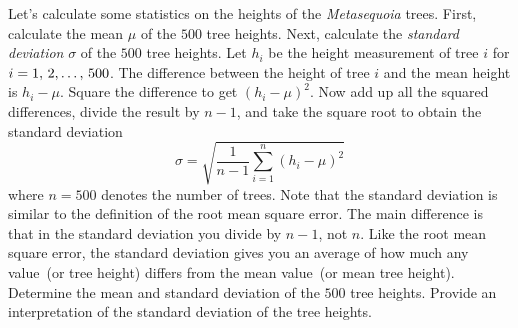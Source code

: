 \documentclass[a4paper,oneside,12pt]{article}
\begin{document}
\begin{problem}
\begin{packedenum}
  \item\label{subprob:logistic:metasequoia_height_mean_stdev}
    Let's calculate some statistics on the heights of the
    \emph{Metasequoia} trees.  First, calculate the mean $\mu$ of the
    $500$ tree heights.  Next, calculate the \emph{standard deviation}
    $\sigma$ of the $500$ tree heights.  Let $h_i$ be the height
    measurement of tree $i$ for $i = {1},\, {2}, \dots,\, {500}$.  The difference
    between the height of tree $i$ and the mean height is $h_i - \mu$.
    Square the difference to get $(h_i - \mu)^2$.  Now add up all the
    squared differences, divide the result by $n - 1$, and take the
    square root to obtain the standard deviation
    \[
    \sigma
    =
    \sqrt{
      \frac{1}{n - 1}
      \sum_{i=1}^n (h_i - \mu)^2
    }
    \]
    where $n = 500$ denotes the number of trees.  Note that the
    standard deviation is similar to the definition of the root mean
    square error.  The main difference is that in the standard
    deviation you divide by $n - 1$, not $n$.  Like the root mean
    square error, the standard deviation gives you an average of how
    much any value~(or tree height) differs from the mean value~(or
    mean tree height).  Determine the mean and standard deviation of
    the $500$ tree heights.  Provide an interpretation of the standard
    deviation of the tree heights.


\end{packedenum}
\end{problem}
\end{document}
